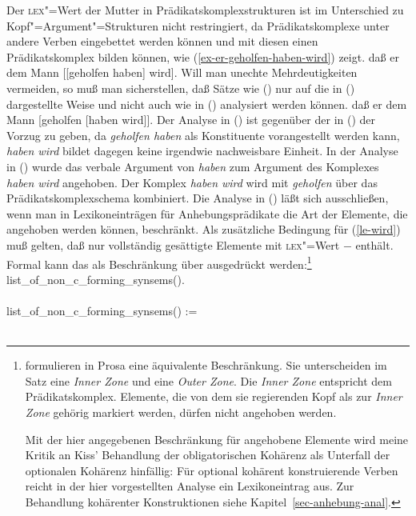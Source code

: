Der \textsc{lex}"=Wert der Mutter in Prädikatskomplexstrukturen ist im Unterschied zu Kopf"=Argument"=Strukturen
nicht restringiert, da Prädikatskomplexe unter andere Verben eingebettet werden können 
und mit diesen einen Prädikatskomplex bilden können, wie (\ref{ex-er-geholfen-haben-wird}) zeigt.
\ea
\label{ex-er-geholfen-haben-wird}
daß er dem Mann [[geholfen haben] wird].
\z
Will man unechte Mehrdeutigkeiten vermeiden, so muß man sicherstellen, daß Sätze wie () nur auf die
in () dargestellte Weise und nicht auch wie in () analysiert werden können.
\ea
\label{bsp-non-complex-forming}
daß er dem Mann [geholfen [haben wird]].
\z
Der Analyse in () ist gegenüber der in () der Vorzug zu geben, da \emph{geholfen
haben} als Konstituente vorangestellt werden kann, \emph{haben wird} bildet dagegen keine irgendwie
nachweisbare Einheit.
In der Analyse in () wurde das verbale Argument von \emph{haben} zum Argument des Komplexes
\emph{haben wird} angehoben. Der Komplex \emph{haben wird} wird mit \emph{geholfen} über das Prädikatskomplexschema
kombiniert. Die Analyse in () läßt sich ausschließen, wenn man in Lexikoneinträgen für Anhebungsprädikate
die Art der Elemente, die angehoben werden können, beschränkt. Als zusätzliche Bedingung
für (\ref{le-wird}) muß gelten, daß  nur vollständig gesättigte
Elemente mit \textsc{lex}"=Wert $-$ enthält. Formal kann das als Beschränkung über 
ausgedrückt werden:\footnote{
        \citet{BvN98a} formulieren in Prosa eine äquivalente Beschränkung. Sie unterscheiden
        im Satz eine \emph{Inner Zone} und eine \emph{Outer Zone}. Die \emph{Inner Zone}
        entspricht dem Prädikatskomplex. Elemente, die von dem sie regierenden Kopf
        als zur \emph{Inner Zone} gehörig markiert werden, dürfen nicht angehoben werden.

Mit der hier angegebenen Beschränkung für angehobene Elemente wird
        meine Kritik \citep[--352]{Mueller99a} an Kiss' Behandlung der obligatorischen Kohärenz
        als Unterfall der optionalen Kohärenz \citep[]{Kiss95a} hinfällig: Für optional kohärent konstruierende
        Verben reicht in der hier vorgestellten Analyse ein Lexikoneintrag aus. Zur Behandlung
        kohärenter Konstruktionen siehe Kapitel~\ref{sec-anhebung-anal}.%
%
}
\eas
\label{constr-non-complex-forming}
list\_of\_non\_c\_forming\_synsems(\eliste).\\\\
list\_of\_non\_c\_forming\_synsems() :=\\\\
